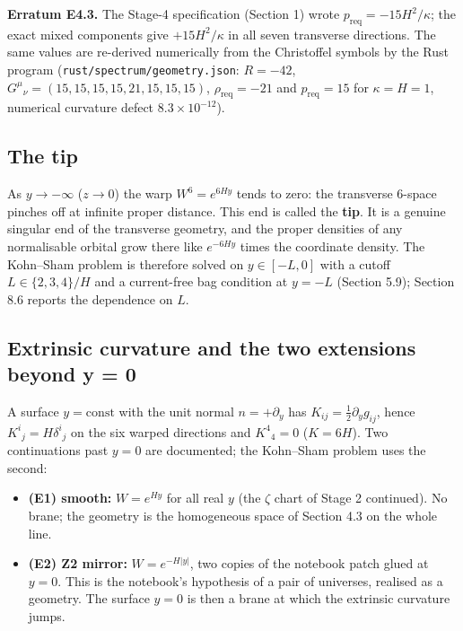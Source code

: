 \documentclass[11pt]{article}
\begin{document}
\textbf{Erratum E4.3.} The Stage-4 specification (Section 1) wrote $p_{\mathrm{req}}=-15H^2/\kappa$; the exact mixed components give $+15H^2/\kappa$ in all seven transverse directions. The same values are re-derived numerically from the Christoffel symbols by the Rust program (\texttt{rust/spe\allowbreak{}ctrum/ge\allowbreak{}ometry.j\allowbreak{}son}: $R=-42$, $G^\mu{}_\nu=(15,15,15,15,21,15,15,15)$, $\rho_{\mathrm{req}}=-21$ and $p_{\mathrm{req}}=15$ for $\kappa=H=1$, numerical curvature defect $8.3\times10^{-12}$).

\subsection{The tip}

As $y\to-\infty$ ($z\to0$) the warp $W^6=e^{6Hy}$ tends to zero: the transverse 6-space pinches off at infinite proper distance. This end is called the \textbf{tip}. It is a genuine singular end of the transverse geometry, and the proper densities of any normalisable orbital grow there like $e^{-6Hy}$ times the coordinate density. The Kohn--Sham problem is therefore solved on $y\in[-L,0]$ with a cutoff $L\in\{2,3,4\}/H$ and a current-free bag condition at $y=-L$ (Section 5.9); Section 8.6 reports the dependence on $L$.

\subsection{Extrinsic curvature and the two extensions beyond y = 0}

A surface $y=\mathrm{const}$ with the unit normal $n=+\partial_y$ has $K_{ij}=\tfrac12\partial_yg_{ij}$, hence $K^i{}_j=H\delta^i{}_j$ on the six warped directions and $K^4{}_4=0$ ($K=6H$). Two continuations past $y=0$ are documented; the Kohn--Sham problem uses the second:

\begin{itemize}
\item \textbf{(E1) smooth:} $W=e^{Hy}$ for all real $y$ (the $\zeta$ chart of Stage 2 continued). No brane; the geometry is the homogeneous space of Section 4.3 on the whole line.
\item \textbf{(E2) Z2 mirror:} $W=e^{-H|y|}$, two copies of the notebook patch glued at $y=0$. This is the notebook's hypothesis of a pair of universes, realised as a geometry. The surface $y=0$ is then a brane at which the extrinsic curvature jumps.
\end{itemize}
\end{document}
